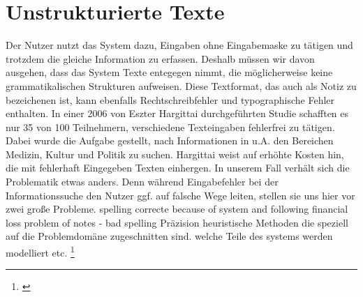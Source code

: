 \section{Unstrukturierte Texte}
Der Nutzer nutzt das System dazu, Eingaben ohne Eingabemaske zu tätigen und trotzdem die gleiche Information zu erfassen.
Deshalb müssen wir davon ausgehen, dass das System Texte entegegen nimmt, die möglicherweise keine grammatikalischen Strukturen aufweisen.
Diese Textformat, das auch als Notiz zu bezeichenen ist, kann ebenfalls Rechtschreibfehler und typographische Fehler enthalten.
In einer 2006 von Eszter Hargittai durchgeführten Studie schafften es nur 35 von 100 Teilnehmern, verschiedene Texteingaben fehlerfrei zu tätigen. 
Dabei wurde die Aufgabe gestellt, nach Informationen in u.A. den Bereichen Medizin, Kultur und Politik zu suchen.
Hargittai weist auf erhöhte Kosten hin, die mit fehlerhaft Eingegeben Texten einhergen. In unserem Fall verhält sich die Problematik etwas anders.
Denn während Eingabefehler bei der Informationssuche den Nutzer ggf. auf falsche Wege leiten, stellen sie uns hier vor zwei große Probleme.
spelling correcte  because of system and following financial loss
problem of notes - bad spelling
Präzision
heuristische Methoden die speziell auf die Problemdomäne zugeschnitten sind.
welche Teile des systems werden modelliert etc.
\footnote{\cite{hargittai2006hurdles}}


